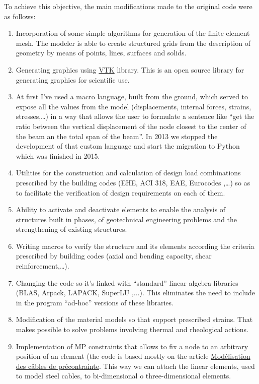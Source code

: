To achieve this objective, the main modifications made to the original code were as follows:

\begin{enumerate}
\item Incorporation of some simple algorithms for generation of the finite element mesh. The modeler is able to create structured grids from the description of geometry by means of points, lines, surfaces and solids.

\item Generating graphics using \href{http://www.vtk.org}{VTK} library. This is an open source library for generating graphics for scientific use. 

\item At first I've used a macro language, built from the ground, which served to expose all the values from the model (displacements, internal forces, strains, stresses,\ldots) in a way that allows the user to formulate a sentence like ``get the ratio between the vertical displacement of the node closest to the center of the beam an the total span of the beam''. In 2013 we stopped the development of that custom language and start the migration to Python which was finished in 2015. 

\item Utilities for the construction and calculation of design load combinations prescribed by the building codes (EHE, ACI 318, EAE, Eurocodes ,\ldots) so as to facilitate the verification of design requirements on each of them.

\item Ability to activate and deactivate elements to enable the analysis of structures built in phases, of geotechnical engineering problems and the strengthening of existing structures.

\item Writing macros to verify the structure and its elements according the criteria prescribed by building codes (axial and bending capacity, shear reinforcement,\ldots).

\item Changing the code so it's linked with ``standard'' linear algebra libraries (BLAS, Arpack, LAPACK, SuperLU ,...). This eliminates the need to include in the program ``ad-hoc'' versions of these libraries.

\item Modification of the material models so that support prescribed strains. That makes possible to solve problems involving thermal and rheological actions.

\item Implementation of MP constraints that allows to fix a node to an arbitrary position of an element (the code is based mostly on the article \href{http://www.code-aster.org/V2/doc/v10/fr/man_r/r7/r7.01.02.pdf}{Modélisation des câbles de précontrainte}. This way we can attach the linear elements, used to model steel cables, to bi-dimensional o three-dimensional elements.

\end{enumerate}

